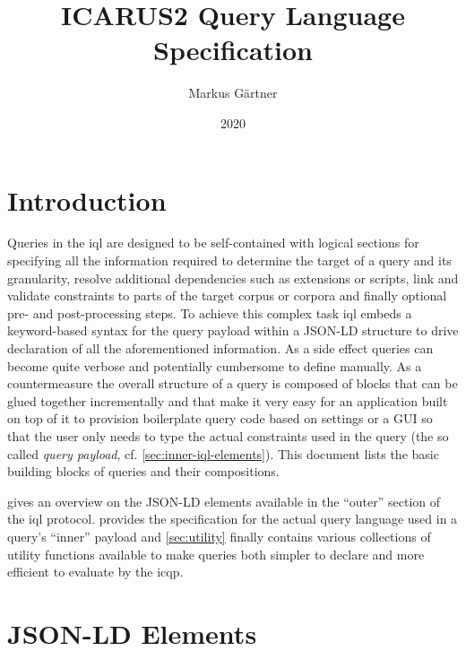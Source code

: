 \documentclass[11pt,a4paper]{article}
\title{ICARUS2 Query Language Specification}
\author{Markus Gärtner}
\date{2020}
\begin{document}
\maketitle

\tableofcontents

\listoffigures

\listoftables

\listoftodos

\newpage

\section{Introduction}
\label{sec:intro}

Queries in the \ac{iql} are designed to be self-contained with logical sections for specifying all the information required to determine the target of a query and its granularity, resolve additional dependencies such as extensions or scripts, link and validate constraints to parts of the target corpus or corpora and finally optional pre- and post-processing steps.
To achieve this complex task \ac{iql} embeds a keyword-based syntax for the query payload within a JSON-LD structure to drive declaration of all the aforementioned information. 
As a side effect queries can become quite verbose and potentially cumbersome to define manually. 
As a countermeasure the overall structure of a query is composed of blocks that can be glued together incrementally and that make it very easy for an application built on top of it to provision boilerplate query code based on settings or a GUI so that the user only needs to type the actual constraints used in the query (the so called \textit{query payload}, cf. \cref{sec:inner-iql-elements}). 
This document lists the basic building blocks of queries and their compositions.

 gives an overview on the JSON-LD elements available in the ``outer'' section of the \ac{iql} protocol.
 provides the specification for the actual query language used in a query's ``inner'' payload and \cref{sec:utility} finally contains various collections of utility functions available to make queries both simpler to declare and more efficient to evaluate by the \ac{icqp}.

\section{JSON-LD Elements}
\label{sec:elements}
\end{document}
